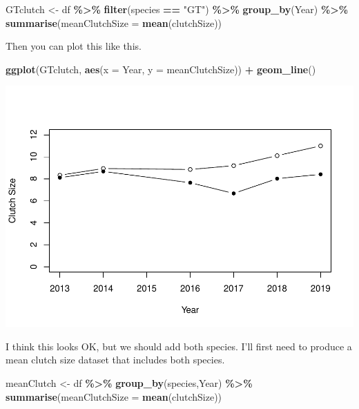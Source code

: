 \documentclass[
  a4paperpaper,
]{book}
\newenvironment{Shaded}{\begin{snugshade}}{\end{snugshade}}
\newcommand{\DataTypeTok}[1]{\textcolor[rgb]{0.13,0.29,0.53}{#1}}
\newcommand{\KeywordTok}[1]{\textcolor[rgb]{0.13,0.29,0.53}{\textbf{#1}}}
\newcommand{\NormalTok}[1]{#1}
\newcommand{\OperatorTok}[1]{\textcolor[rgb]{0.81,0.36,0.00}{\textbf{#1}}}
\newcommand{\StringTok}[1]{\textcolor[rgb]{0.31,0.60,0.02}{#1}}
\begin{document}
\begin{Shaded}
\begin{Highlighting}[]
\NormalTok{GTclutch \textless{}{-}}\StringTok{ }\NormalTok{df }\OperatorTok{\%\textgreater{}\%}\StringTok{ }
\StringTok{  }\KeywordTok{filter}\NormalTok{(species }\OperatorTok{==}\StringTok{ "GT"}\NormalTok{) }\OperatorTok{\%\textgreater{}\%}
\StringTok{  }\KeywordTok{group\_by}\NormalTok{(Year) }\OperatorTok{\%\textgreater{}\%}\StringTok{ }
\StringTok{  }\KeywordTok{summarise}\NormalTok{(}\DataTypeTok{meanClutchSize =} \KeywordTok{mean}\NormalTok{(clutchSize))}
\end{Highlighting}
\end{Shaded}

Then you can plot this like this.

\begin{Shaded}
\begin{Highlighting}[]
\KeywordTok{ggplot}\NormalTok{(GTclutch, }\KeywordTok{aes}\NormalTok{(}\DataTypeTok{x =}\NormalTok{ Year, }\DataTypeTok{y =}\NormalTok{ meanClutchSize)) }\OperatorTok{+}
\StringTok{         }\KeywordTok{geom\_line}\NormalTok{()}
\end{Highlighting}
\end{Shaded}

\includegraphics{BB852_files/figure-latex/unnamed-chunk-82-1.pdf}

I think this looks OK, but we should add both species. I'll first need to produce a mean clutch size dataset that includes both species.

\begin{Shaded}
\begin{Highlighting}[]
\NormalTok{meanClutch \textless{}{-}}\StringTok{ }\NormalTok{df }\OperatorTok{\%\textgreater{}\%}\StringTok{ }
\StringTok{  }\KeywordTok{group\_by}\NormalTok{(species,Year) }\OperatorTok{\%\textgreater{}\%}\StringTok{ }
\StringTok{  }\KeywordTok{summarise}\NormalTok{(}\DataTypeTok{meanClutchSize =} \KeywordTok{mean}\NormalTok{(clutchSize))}
\end{Highlighting}
\end{Shaded}
\end{document}
